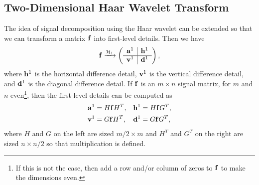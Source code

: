 \documentclass{article}
\theoremstyle{definition}
\begin{document}
  \subsection{Two-Dimensional Haar Wavelet Transform}
  The idea of signal decomposition using the Haar wavelet can be extended so that we can transform a matrix \(\vb{f}\) into first-level details. Then we have
  \begin{equation} 
    \vb{f} \xrightarrow{\mathcal{H}_1} \left(\begin{array}{c|c}
      \vb{a}^1 & \vb{h}^1\\ \hline
      \vb{v}^1 & \vb{d}^1
    \end{array}\right),
  \end{equation}
  where \(\vb{h}^1\) is the horizontal difference detail, \(\vb{v}^1\) is the vertical difference detail, and \(\vb{d}^1\) is the diagonal difference detail. If \(\vb{f}\) is an \(m \times n\) signal matrix, for \(m\) and \(n\) even\footnote{If this is not the case, then add a row and/or column of zeros to \(\vb{f}\) to make the dimensions even.}, then the first-level details can be computed as
  \begin{align*}
    \vb{a}^1 &= H \vb{f} H^T, &
    \vb{h}^1 &= H \vb{f} G^T, \\
    \vb{v}^1 &= G \vb{f} H^T, &
    \vb{d}^1 &= G \vb{f} G^T,
  \end{align*}
  where \(H\) and \(G\) on the left are sized \(m/2 \times m\) and \(H^T\) and \(G^T\) on the right are sized \(n \times n/2\) so that multiplication is defined.
  
\end{document}
